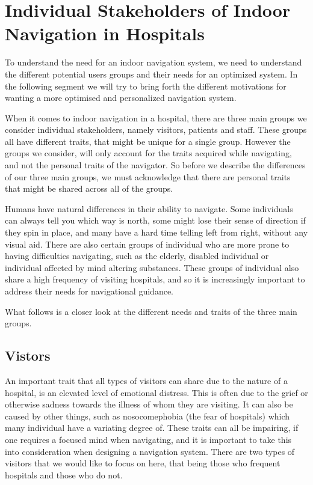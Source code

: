 \section{Individual Stakeholders of Indoor Navigation in Hospitals} %
\label{sec:interusers}

To understand the need for an indoor navigation system, we need to understand the different potential users groups and their needs for an optimized system. In the following segment we will try to bring forth the different motivations for wanting a more optimised and personalized navigation system.

When it comes to indoor navigation in a hospital, there are three main groups we consider individual stakeholders, namely visitors, patients and staff. These groups all have different traits, that might be unique for a single group. However the groups we consider, will only account for the traits acquired while navigating, and not the personal traits of the navigator. So before we describe the differences of our three main groups, we must acknowledge that there are personal traits that might be shared across all of the groups.

Humans have natural differences in their ability to navigate. Some individuals can always tell you which way is north, some might lose their sense of direction if they spin in place, and many have a hard time telling left from right, without any visual aid. There are also certain groups of individual who are more prone to having difficulties navigating, such as the elderly, disabled individual or individual affected by mind altering substances. These groups of individual also share a high frequency of visiting hospitals, and so it is increasingly important to address their needs for navigational guidance.

What follows is a closer look at the different needs and traits of the three main groups.

\subsection{Vistors} %
 \label{par:vistors}
 

An important trait that all types of visitors can share due to the nature of a hospital, is an elevated level of emotional distress. This is often due to the grief or otherwise sadness towards the illness of whom they are visiting. It can also be caused by other things, such as nosocomephobia (the fear of hospitals) which many individual have a variating degree of. These traits can all be impairing, if one requires a focused mind when navigating, and it is important to take this into consideration when designing a navigation system. There are two types of visitors that we would like to focus on here, that being those who frequent hospitals and those who do not.

